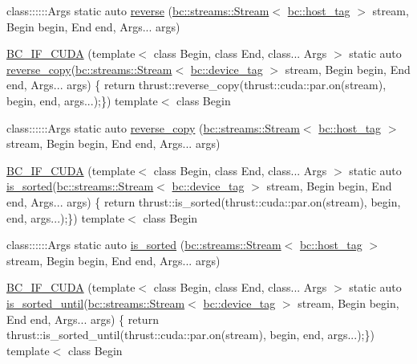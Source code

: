 \begin{DoxyCompactItemize}
\item 
class\+::::::\+Args static auto \hyperlink{namespacebc_1_1algorithms_abb783ac679bb0f75ee3a5ec7defed717}{reverse} (\hyperlink{classbc_1_1streams_1_1Stream}{bc\+::streams\+::\+Stream}$<$ \hyperlink{structbc_1_1host__tag}{bc\+::host\+\_\+tag} $>$ stream, Begin begin, End end, Args... args)
\item 
\hyperlink{namespacebc_1_1algorithms_a3a26792cd5c28bc9b78db4214670103a}{B\+C\+\_\+\+I\+F\+\_\+\+C\+U\+DA} (template$<$ class Begin, class End, class... Args $>$ static auto \hyperlink{namespacebc_1_1algorithms_a3a74918fac3854d0a24a5052f58d7d01}{reverse\+\_\+copy}(\hyperlink{classbc_1_1streams_1_1Stream}{bc\+::streams\+::\+Stream}$<$ \hyperlink{structbc_1_1device__tag}{bc\+::device\+\_\+tag} $>$ stream, Begin begin, End end, Args... args) \{ return thrust\+::reverse\+\_\+copy(thrust\+::cuda\+::par.\+on(stream), begin, end, args...);\}) template$<$ class Begin
\item 
class\+::::::\+Args static auto \hyperlink{namespacebc_1_1algorithms_a3a74918fac3854d0a24a5052f58d7d01}{reverse\+\_\+copy} (\hyperlink{classbc_1_1streams_1_1Stream}{bc\+::streams\+::\+Stream}$<$ \hyperlink{structbc_1_1host__tag}{bc\+::host\+\_\+tag} $>$ stream, Begin begin, End end, Args... args)
\item 
\hyperlink{namespacebc_1_1algorithms_a37c8c1c3f5100026d63c022dcc5f26a9}{B\+C\+\_\+\+I\+F\+\_\+\+C\+U\+DA} (template$<$ class Begin, class End, class... Args $>$ static auto \hyperlink{namespacebc_1_1algorithms_a594cc8e5bcd2484bd994f4301cc5f448}{is\+\_\+sorted}(\hyperlink{classbc_1_1streams_1_1Stream}{bc\+::streams\+::\+Stream}$<$ \hyperlink{structbc_1_1device__tag}{bc\+::device\+\_\+tag} $>$ stream, Begin begin, End end, Args... args) \{ return thrust\+::is\+\_\+sorted(thrust\+::cuda\+::par.\+on(stream), begin, end, args...);\}) template$<$ class Begin
\item 
class\+::::::\+Args static auto \hyperlink{namespacebc_1_1algorithms_a594cc8e5bcd2484bd994f4301cc5f448}{is\+\_\+sorted} (\hyperlink{classbc_1_1streams_1_1Stream}{bc\+::streams\+::\+Stream}$<$ \hyperlink{structbc_1_1host__tag}{bc\+::host\+\_\+tag} $>$ stream, Begin begin, End end, Args... args)
\item 
\hyperlink{namespacebc_1_1algorithms_a3284ffc9b6592ebae025026a49b934ef}{B\+C\+\_\+\+I\+F\+\_\+\+C\+U\+DA} (template$<$ class Begin, class End, class... Args $>$ static auto \hyperlink{namespacebc_1_1algorithms_ae61a19a001cd4acf6528f9bf5e6aef32}{is\+\_\+sorted\+\_\+until}(\hyperlink{classbc_1_1streams_1_1Stream}{bc\+::streams\+::\+Stream}$<$ \hyperlink{structbc_1_1device__tag}{bc\+::device\+\_\+tag} $>$ stream, Begin begin, End end, Args... args) \{ return thrust\+::is\+\_\+sorted\+\_\+until(thrust\+::cuda\+::par.\+on(stream), begin, end, args...);\}) template$<$ class Begin

\end{DoxyCompactItemize}
